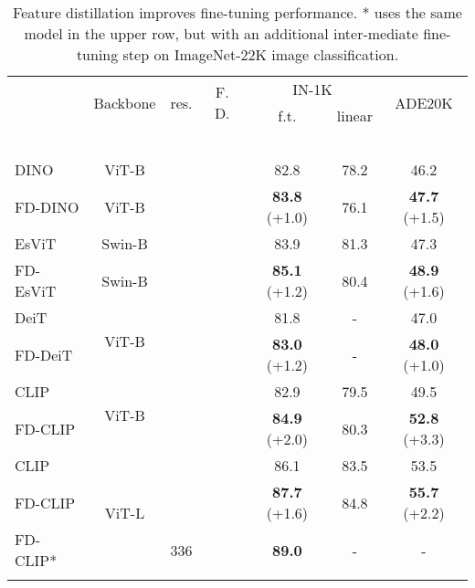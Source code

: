 \documentclass{article}
\begin{document}
\begin{table}[t]
\caption{Feature distillation improves fine-tuning performance. * uses the same model in the upper row, but with an additional inter-mediate fine-tuning step on ImageNet-22K image classification.}
\centering
  \begin{tabular}{l|c|c|c|cc|c}
\Xhline{1.0pt}
  \multirow{2}{*}{Method} & \multirow{2}{*}{Backbone} & \multirow{2}{*}{res.} & \multirow{2}{*}{F. D.} &  \multicolumn{2}{c|}{IN-1K} & \multirow{2}{*}{ADE20K}  \\
  \cline{5-6}
   &  &  &  & f.t. & linear   &   \\
  \hline
  \color{gray}{BEiT~\cite{bao2021beit}} & \color{gray}{ViT-B} & \color{gray}{} & & \color{gray}{83.2} & \color{gray}{37.6} & \color{gray}{47.1} \\
  \color{gray}{MAE~\cite{MaskedAutoencoders2021}} & \color{gray}{ViT-B} & \color{gray}{} & & \color{gray}{83.6} & \color{gray}{68.0} & \color{gray}{48.1} \\
  \color{gray}{SimMIM~\cite{xie2021simmim}} & \color{gray}{ViT-B} & \color{gray}{} & & \color{gray}{83.8} & \color{gray}{56.7} & \color{gray}{47.6} \\
  \color{gray}{SimMIM~\cite{xie2021simmim}} & \color{gray}{Swin-B} & \color{gray}{} & & \color{gray}{84.8} & \color{gray}{24.8} & \color{gray}{48.3} \\
   \hline
\color{gray}{WiSE-FT CLIP~\cite{ftclip2021}} & \color{gray}{ViT-L} & \color{gray}{336} & \color{gray}{} & \color{gray}{87.1} & \color{gray}{-} & \color{gray}{-}\\
  \hline
  \hline
  DINO~\cite{caron2021emerging} & ViT-B &  & & 82.8 & 78.2 & 46.2 \\
  FD-DINO & ViT-B &  &  & \textbf{83.8}\scriptsize{ (+1.0)} & 76.1 &  \textbf{47.7}\scriptsize{ (+1.5)}\\
  \hline
  \hline
  EsViT~\cite{li2021esvit} & Swin-B &  & & 83.9 & 81.3 & 47.3 \\
  FD-EsViT & Swin-B &  &  & \textbf{85.1}\scriptsize{ (+1.2)} & 80.4 & \textbf{48.9}\scriptsize{ (+1.6)}\\
  \hline
  \hline
  DeiT~\cite{touvron2020deit} & \multirow{2}{*}{ViT-B} & \multirow{1}{*}{} & & 81.8 & - & 47.0 \\
  FD-DeiT &  & \multirow{1}{*}{} &  & \textbf{83.0}\scriptsize{ (+1.2)} & - & \textbf{48.0} \scriptsize{ (+1.0)} \\
  \hline
    \hline
  CLIP~\cite{radford2021clip} & \multirow{2}{*}{ViT-B} & \multirow{1}{*}{} &  & 82.9 & 79.5 & 49.5 \\
  FD-CLIP & & \multirow{1}{*}{} &  & \textbf{84.9}\scriptsize{ (+2.0)} & 80.3 & \textbf{52.8}\scriptsize{ (+3.3)} \\
  \hline
  CLIP~\cite{radford2021clip} & \multirow{3}{*}{ViT-L} & \multirow{1}{*}{} & & 86.1 & 83.5 & 53.5\\
  FD-CLIP &  &  &  & \textbf{87.7}\scriptsize{ (+1.6)} & 84.8 & \textbf{55.7}\scriptsize{ (+2.2)}\\
  FD-CLIP* & & 336 &  & \textbf{89.0}\scriptsize{} &  - & - \\
\Xhline{1.0pt}
  \end{tabular}
\label{tab:teaser_FD}
\end{table}
\end{document}
